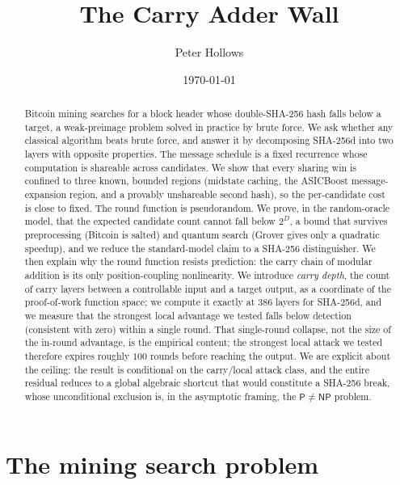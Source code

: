 \documentclass[11pt]{article}
\title{\textbf{The Carry Adder Wall}}
\author{Peter Hollows}
\date{\today}
\theoremstyle{remark}
\begin{document}
\maketitle

\begin{abstract}
Bitcoin mining searches for a block header whose double-SHA-256 hash
falls below a target, a weak-preimage problem solved in practice by
brute force. We ask whether any classical algorithm beats brute force,
and answer it by decomposing SHA-256d into two layers with opposite
properties. The message schedule is a fixed recurrence whose computation
is shareable across candidates. We show that every sharing
win is confined to three known, bounded regions (midstate caching, the
ASICBoost message-expansion region, and a provably unshareable second
hash), so the per-candidate cost is close to fixed. The round function
is pseudorandom. We prove, in the random-oracle model, that the
expected candidate count cannot fall below $2^{D}$, a
bound that survives preprocessing (Bitcoin is salted) and quantum search
(Grover gives only a quadratic speedup), and we reduce the
standard-model claim to a SHA-256 distinguisher. We then explain why the
round function resists prediction: the carry chain of modular addition is
its only position-coupling nonlinearity. We introduce \emph{carry depth},
the count of carry layers between a controllable input and a target
output, as a coordinate of the proof-of-work function space; we compute
it exactly at $386$ layers for SHA-256d, and we measure that the
strongest local advantage we tested falls below detection (consistent
with zero) within a single round. That single-round collapse, not the
size of the in-round advantage, is the empirical content; the strongest
local attack we tested therefore expires roughly $100$ rounds before
reaching the output. We are explicit about the ceiling: the result is
conditional on the carry/local attack class, and the entire residual
reduces to a global algebraic shortcut that would constitute a SHA-256
break, whose unconditional exclusion is, in the asymptotic framing, the
$\mathsf{P}\ne\mathsf{NP}$ problem.
\end{abstract}

\section{The mining search problem}
\end{document}
